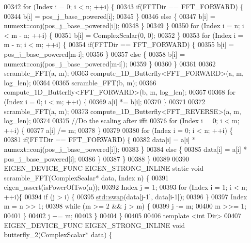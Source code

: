 \begin{DoxyCode}
00342     \textcolor{keywordflow}{for} (Index i = 0; i < n; ++i) \{
00343       \textcolor{keywordflow}{if}(FFTDir == FFT\_FORWARD) \{
00344         b[i] = pos\_j\_base\_powered[i];
00345       \}
00346       \textcolor{keywordflow}{else} \{
00347         b[i] = numext::conj(pos\_j\_base\_powered[i]);
00348       \}
00349     \}
00350     \textcolor{keywordflow}{for} (Index i = n; i < m - n; ++i) \{
00351       b[i] = ComplexScalar(0, 0);
00352     \}
00353     \textcolor{keywordflow}{for} (Index i = m - n; i < m; ++i) \{
00354       \textcolor{keywordflow}{if}(FFTDir == FFT\_FORWARD) \{
00355         b[i] = pos\_j\_base\_powered[m-i];
00356       \}
00357       \textcolor{keywordflow}{else} \{
00358         b[i] = numext::conj(pos\_j\_base\_powered[m-i]);
00359       \}
00360     \}
00361 
00362     scramble\_FFT(a, m);
00363     compute\_1D\_Butterfly<FFT\_FORWARD>(a, m, log\_len);
00364 
00365     scramble\_FFT(b, m);
00366     compute\_1D\_Butterfly<FFT\_FORWARD>(b, m, log\_len);
00367 
00368     \textcolor{keywordflow}{for} (Index i = 0; i < m; ++i) \{
00369       a[i] *= b[i];
00370     \}
00371 
00372     scramble\_FFT(a, m);
00373     compute\_1D\_Butterfly<FFT\_REVERSE>(a, m, log\_len);
00374 
00375     \textcolor{comment}{//Do the scaling after ifft}
00376     \textcolor{keywordflow}{for} (Index i = 0; i < m; ++i) \{
00377       a[i] /= m;
00378     \}
00379 
00380     \textcolor{keywordflow}{for} (Index i = 0; i < n; ++i) \{
00381       \textcolor{keywordflow}{if}(FFTDir == FFT\_FORWARD) \{
00382         data[i] = a[i] * numext::conj(pos\_j\_base\_powered[i]);
00383       \}
00384       \textcolor{keywordflow}{else} \{
00385         data[i] = a[i] * pos\_j\_base\_powered[i];
00386       \}
00387     \}
00388   \}
00389 
00390   EIGEN\_DEVICE\_FUNC EIGEN\_STRONG\_INLINE \textcolor{keyword}{static} \textcolor{keywordtype}{void} scramble\_FFT(ComplexScalar* data, Index n) \{
00391     eigen\_assert(isPowerOfTwo(n));
00392     Index j = 1;
00393     \textcolor{keywordflow}{for} (Index i = 1; i < n; ++i)\{
00394       \textcolor{keywordflow}{if} (j > i) \{
00395         \hyperlink{endian_8c_a3ca5ecd34b04d6a243c054ac3a57f68d}{std::swap}(data[j-1], data[i-1]);
00396       \}
00397       Index m = n >> 1;
00398       \textcolor{keywordflow}{while} (m >= 2 && j > m) \{
00399         j -= m;
00400         m >>= 1;
00401       \}
00402       j += m;
00403     \}
00404   \}
00405 
00406   \textcolor{keyword}{template} <\textcolor{keywordtype}{int} Dir>
00407   EIGEN\_DEVICE\_FUNC EIGEN\_STRONG\_INLINE \textcolor{keywordtype}{void} butterfly\_2(ComplexScalar* data) \{

\end{DoxyCode}
